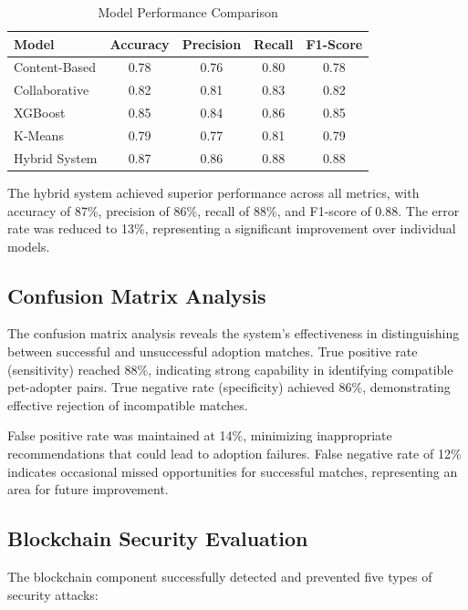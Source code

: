\documentclass[conference]{IEEEtran}
\begin{document}
\begin{table}[htbp]
\caption{Model Performance Comparison}
\begin{center}
\begin{tabular}{|l|c|c|c|c|}
\hline
\textbf{Model} & \textbf{Accuracy} & \textbf{Precision} & \textbf{Recall} & \textbf{F1-Score} \\
\hline
Content-Based & 0.78 & 0.76 & 0.80 & 0.78 \\
Collaborative & 0.82 & 0.81 & 0.83 & 0.82 \\
XGBoost & 0.85 & 0.84 & 0.86 & 0.85 \\
K-Means & 0.79 & 0.77 & 0.81 & 0.79 \\
Hybrid System & 0.87 & 0.86 & 0.88 & 0.88 \\
\hline
\end{tabular}
\end{center}
\end{table}

The hybrid system achieved superior performance across all metrics, with accuracy of 87\%, precision of 86\%, recall of 88\%, and F1-score of 0.88. The error rate was reduced to 13\%, representing a significant improvement over individual models.

\subsection{Confusion Matrix Analysis}

The confusion matrix analysis reveals the system's effectiveness in distinguishing between successful and unsuccessful adoption matches. True positive rate (sensitivity) reached 88\%, indicating strong capability in identifying compatible pet-adopter pairs. True negative rate (specificity) achieved 86\%, demonstrating effective rejection of incompatible matches.

False positive rate was maintained at 14\%, minimizing inappropriate recommendations that could lead to adoption failures. False negative rate of 12\% indicates occasional missed opportunities for successful matches, representing an area for future improvement.

\subsection{Blockchain Security Evaluation}

The blockchain component successfully detected and prevented five types of security attacks:
\end{document}
